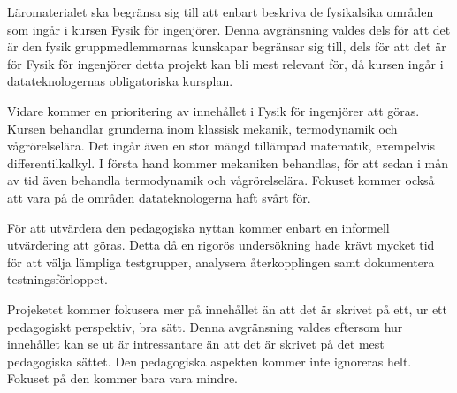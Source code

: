 \begin{draft}

Läromaterialet ska begränsa sig till att enbart beskriva de fysikalsika områden
som ingår i kursen Fysik för ingenjörer. Denna avgränsning valdes dels för att
det är den fysik gruppmedlemmarnas kunskapar begränsar sig till, dels för att
det är för Fysik för ingenjörer detta projekt kan bli mest relevant för, då
kursen ingår i datateknologernas obligatoriska kursplan.

Vidare kommer en prioritering av innehållet i Fysik för ingenjörer att göras.
Kursen behandlar grunderna inom klassisk mekanik, termodynamik och
vågrörelselära. Det ingår även en stor mängd tillämpad matematik, exempelvis
differentilkalkyl. I första hand kommer mekaniken behandlas, för att sedan i mån
av tid även behandla termodynamik och vågrörelselära. Fokuset kommer också att
vara på de områden datateknologerna haft svårt för.

För att utvärdera den pedagogiska nyttan kommer enbart en informell utvärdering
att göras. Detta då en rigorös undersökning hade krävt mycket tid för att välja
lämpliga testgrupper, analysera återkopplingen samt dokumentera
testningsförloppet.

Projeketet kommer fokusera mer på innehållet än att det är skrivet på ett, ur
ett pedagogiskt perspektiv, bra sätt. Denna avgränsning valdes eftersom hur
innehållet kan se ut är intressantare än att det är skrivet på det mest
pedagogiska sättet. Den pedagogiska aspekten kommer inte ignoreras helt. Fokuset
på den kommer bara vara mindre.

\end{draft}



